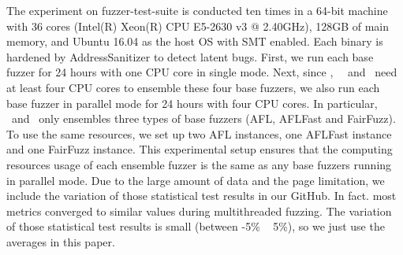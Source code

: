 The experiment on fuzzer-test-suite is conducted ten times in a 64-bit machine with 36 cores (Intel(R) Xeon(R) CPU E5-2630 v3 @ 2.40GHz), 128GB of main memory, and Ubuntu 16.04 as the host OS with SMT enabled. Each binary is hardened by AddressSanitizer \cite{SanitizerCoverage} to detect latent bugs.
First, we run each base fuzzer for 24 hours with one CPU core in single mode.
Next, since \toolTwo, ~\toolThree ~and \toolFive ~need at least four CPU cores to ensemble these four base fuzzers, we also run each base fuzzer in parallel mode for 24 hours with four CPU cores. 
In particular, \toolOne ~and \toolFour ~only ensembles three types of base fuzzers (AFL, AFLFast and FairFuzz). To use the same resources, we set up two AFL instances, one AFLFast instance and one FairFuzz instance.
This experimental setup ensures that the computing resources usage of each ensemble fuzzer is the same as any base fuzzers running in parallel mode.
Due to the large amount of data and the page limitation, we include the variation of those statistical test results in our GitHub. In fact. most metrics converged to similar values during multithreaded fuzzing. The variation of those statistical test results is small (between -5\% ~ 5\%), so we just use the averages in this paper.

